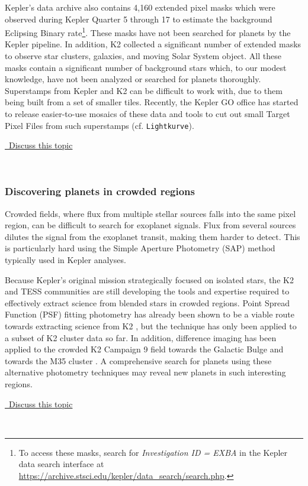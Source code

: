 \documentclass[modern]{aastex62}
\newcommand{\commentlink}[1]{\href{https://github.com/KeplerGO/ScientificOpportunities/issues/#1}{\sc \faExternalLink\ Discuss this topic}\,\,}
\begin{document}
Kepler's data archive also contains 4,160 extended pixel masks which were observed during Kepler Quarter 5 through 17 to estimate the background Eclipsing Binary rate\footnote{To access these masks, search for {\em Investigation ID = EXBA} in the Kepler data search interface at \url{https://archive.stsci.edu/kepler/data_search/search.php}.}. These masks have not been searched for planets by the Kepler pipeline. In addition, K2 collected a significant number of extended masks to observe star clusters, galaxies, and moving Solar System object.  All these masks contain a significant number of background stars which, to our modest knowledge, have not been analyzed or searched for planets thoroughly. Superstamps from Kepler and K2 can be difficult to work with, due to them being built from a set of smaller tiles. Recently, the Kepler GO office has started to release easier-to-use mosaics of these data \citep{cody2018} and tools to cut out small Target Pixel Files from such superstamps (cf. \texttt{Lightkurve}).
\\
\begin{center}
\commentlink{3}
\end{center}
\ \\

\subsubsection{Discovering planets in crowded regions}
Crowded fields, where flux from multiple stellar sources falls into the same pixel region, can be difficult to search for exoplanet signals. Flux from several sources dilutes the signal from the exoplanet transit, making them harder to detect. This is particularly hard using the Simple Aperture Photometry (SAP) method typically used in Kepler analyses.

Because Kepler's original mission strategically focused on isolated stars, the K2 and TESS communities are still developing the tools and expertise required to effectively extract science from blended stars in crowded regions. Point Spread Function (PSF) fitting photometry has already been shown to be a viable route towards extracting science from K2 \citep{libralato2016,libralatob2016,nardiello2016}, but the technique has only been applied to a subset of K2 cluster data so far.  In addition, difference imaging has been applied to the crowded K2 Campaign 9 field towards the Galactic Bulge \citep{wang2017} and towards the M35 cluster \citep{soares2017}. A comprehensive search for planets using these alternative photometry techniques may reveal new planets in such interesting regions.
\\
\begin{center}
\commentlink{4}
\end{center}
\ \\
\end{document}
